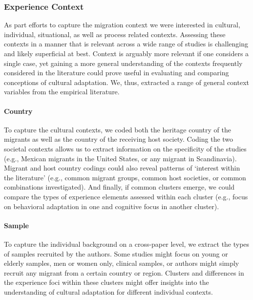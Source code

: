 \documentclass[man, 12pt, a4paper]{apa7}
\begin{document}
\subsubsection{Experience Context}
As part efforts to capture the migration context we were interested in cultural, individual, situational, as well as process related contexts. Assessing these contexts in a manner that is relevant across a wide range of studies is challenging and likely superficial at best. Context is arguably more relevant if one considers a single case, yet gaining a more general understanding of the contexts frequently considered in the literature could prove useful in evaluating and comparing conceptions of cultural adaptation. We, thus, extracted a range of general context variables from the empirical literature.

\paragraph{Country}
To capture the cultural contexts, we coded both the heritage country of the migrants as well as the country of the receiving host society. Coding the two societal contexts allows us to extract information on the specificity of the studies (e.g., Mexican migrants in the United States, or any migrant in Scandinavia). Migrant and host country codings could also reveal patterns of `interest within the literature' (e.g., common migrant groups, common host societies, or common combinations investigated). And finally, if common clusters emerge, we could compare the types of experience elements assessed within each cluster (e.g., focus on behavioral adaptation in one and cognitive focus in another cluster). 

\paragraph{Sample}
To capture the individual background on a cross-paper level, we extract the types of samples recruited by the authors. Some studies might focus on young or elderly samples, men or women only, clinical samples, or authors might simply recruit any migrant from a certain country or region. Clusters and differences in the experience foci within these clusters might offer insights into the understanding of cultural adaptation for different individual contexts.
\end{document}
